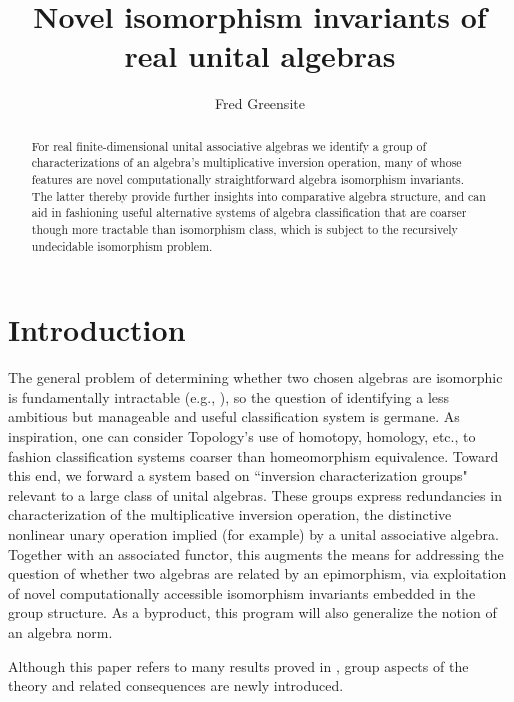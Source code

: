 \documentclass{amsart}
\numberwithin{equation}{section}
\theoremstyle{definition}
\numberwithin{theorem}{section}
\begin{document}
       
             \title{Novel isomorphism invariants of real unital algebras}
    \author{Fred Greensite}
    
   \begin{abstract}  For real finite-dimensional unital associative algebras we identify a group of characterizations of an algebra's multiplicative inversion operation, many of whose features are novel computationally straightforward algebra isomorphism invariants.  The latter thereby provide further insights into comparative algebra structure, and can aid in fashioning useful alternative systems of algebra classification that are coarser though more tractable than isomorphism class, which is subject to the recursively undecidable isomorphism problem.
   \end{abstract}
        
  \maketitle
  
 
  \section{Introduction} The general problem of determining whether two chosen algebras are isomorphic is fundamentally intractable (e.g., \cite{drozd:1972,prest:1991,belitskii:2003}), so the question of identifying a  less ambitious but manageable and useful classification system is germane.  As inspiration, one can consider Topology's use of homotopy, homology, etc., to fashion classification systems coarser than homeomorphism equivalence.  Toward this end, we forward a system based on  ``inversion characterization groups" relevant to a large class of unital algebras.  These groups express redundancies in characterization of the multiplicative inversion operation, the distinctive nonlinear unary operation implied (for example) by a unital associative algebra. Together with an associated functor, this augments the means for addressing the question of whether two algebras are related by an epimorphism, via exploitation of novel computationally accessible isomorphism invariants embedded in the group structure.
    As a byproduct, this program will also generalize the notion of an algebra norm.
  
  Although this paper refers to many results proved in \cite{fgreensite:2023}, group aspects of the theory and related consequences are newly introduced.
   
\end{document}
